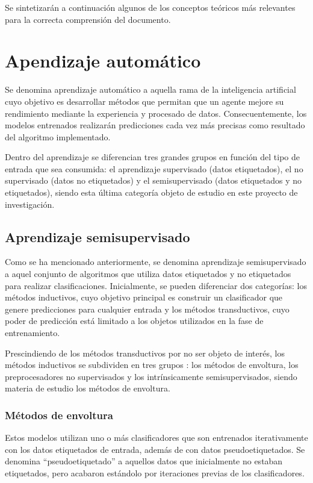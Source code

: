 
Se sintetizarán a continuación algunos de los conceptos teóricos más relevantes para la correcta comprensión del documento.

\section{Apendizaje automático}

Se denomina aprendizaje automático a aquella rama de la inteligencia artificial cuyo objetivo es desarrollar métodos que permitan que un agente mejore su rendimiento mediante la experiencia y procesado de datos. Consecuentemente, los modelos entrenados realizarán predicciones cada vez más precisas como resultado del algoritmo implementado.

Dentro del aprendizaje se diferencian tres grandes grupos en función del tipo de entrada que sea consumida: el aprendizaje supervisado (datos etiquetados), el no supervisado (datos no etiquetados) y el semisupervisado (datos etiquetados y no etiquetados), siendo esta última categoría objeto de estudio en este proyecto de investigación.

\subsection{Aprendizaje semisupervisado}

Como se ha mencionado anteriormente, se denomina aprendizaje semisupervisado a aquel conjunto de algoritmos que utiliza datos etiquetados y no etiquetados para realizar clasificaciones. Inicialmente, se pueden diferenciar dos categorías: los métodos inductivos, cuyo objetivo principal es construir un clasificador que genere predicciones para cualquier entrada y los métodos transductivos, cuyo poder de predicción está limitado a los objetos utilizados en la fase de entrenamiento.

Prescindiendo de los métodos transductivos por no ser objeto de interés, los métodos inductivos se subdividen en tres grupos \cite{engelen-hoos}: los métodos de envoltura, los preprocesadores no supervisados y los intrínsicamente semisupervisados, siendo materia de estudio los métodos de envoltura. 


\subsubsection{Métodos de envoltura}

Estos modelos utilizan uno o más clasificadores que son entrenados iterativamente con los datos etiquetados de entrada, además de con datos pseudoetiquetados. Se denomina “pseudoetiquetado” a aquellos datos que inicialmente no estaban etiquetados, pero acabaron estándolo por iteraciones previas de los clasificadores.

